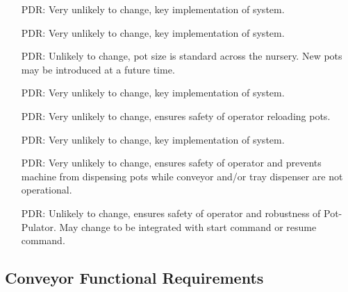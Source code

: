 \documentclass[12pt]{article}
\newcounter{pdreqnum} %
\newcounter{reqnum} %
\newcounter{lcpdreqnum} %
\begin{document}
\noindent \begin{itemize}

\item[PDR\refstepcounter{lcpdreqnum}\thelcpdreqnum\label{LC_meaningfulLabel7}:] {Very unlikely to change,
    key implementation of system.}

\item[PDR\refstepcounter{lcpdreqnum}\thelcpdreqnum\label{LC_meaningfulLabel8}:] {Very unlikely to change,
    key implementation of system.}

\item[PDR\refstepcounter{lcpdreqnum}\thelcpdreqnum\label{LC_meaningfulLabel9}:] {Unlikely to change,
    pot size is standard across the nursery. New pots may be introduced at a future time.}

\item[PDR\refstepcounter{lcpdreqnum}\thelcpdreqnum\label{LC_meaningfulLabel10}:] {Very unlikely to change,
    key implementation of system.}

\item[PDR\refstepcounter{lcpdreqnum}\thelcpdreqnum\label{LC_meaningfulLabel11}:] {Very unlikely to change,
    ensures safety of operator reloading pots.}

\item[PDR\refstepcounter{lcpdreqnum}\thelcpdreqnum\label{LC_meaningfulLabel12}:] {Very unlikely to change,
    key implementation of system.}

\item[PDR\refstepcounter{lcpdreqnum}\thelcpdreqnum\label{LC_meaningfulLabel3}:] {Very unlikely to change,
    ensures safety of operator and prevents machine from dispensing pots while conveyor and/or tray dispenser
    are not operational.}

\item[PDR\refstepcounter{lcpdreqnum}\thelcpdreqnum\label{LC_meaningfulLabel4}:] {Unlikely to change,
    ensures safety of operator and robustness of Pot-Pulator. May change to be integrated with start
    command or resume command.}

\end{itemize}

\subsection{Conveyor Functional Requirements}
\end{document}
